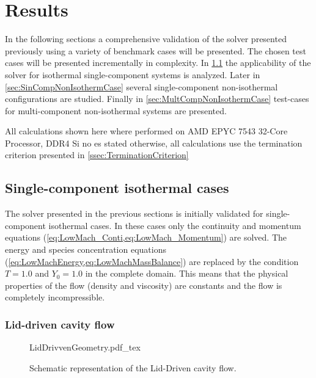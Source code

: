 \chapter{Results}	\label{ch:results}
\glsresetall
In the following sections a comprehensive validation of the solver presented previously using a variety of benchmark cases will be presented. The chosen test cases will be presented incrementally in complexity. In \cref{sec:SingleCompIsotCase} the applicability of the solver for isothermal single-component systems is analyzed. Later in \cref{sec:SinCompNonIsothermCase} several single-component non-isothermal configurations are studied. Finally in \cref{sec:MultCompNonIsothermCase} test-cases for multi-component non-isothermal systems are presented. 



All calculations shown here where performed on AMD EPYC 7543 32-Core Processor, DDR4 %
Si no es stated otherwise, all calculations use the termination criterion presented in \cref{ssec:TerminationCriterion}



\section{Single-component isothermal cases}\label{sec:SingleCompIsotCase}
The solver presented in the previous sections is initially validated for single-component isothermal cases. In these cases only the continuity and momentum equations (\cref{eq:LowMach_Conti,eq:LowMach_Momentum}) are solved. The energy and species concentration equations (\cref{eq:LowMachEnergy,eq:LowMachMassBalance}) are replaced by the condition $T = 1.0$ and $Y_0 = 1.0$ in the complete domain. This means that the physical properties of the flow (density and viscosity) are constants and the flow is completely incompressible.

\subsection{Lid-driven cavity flow}
\begin{figure}[b]
	\begin{center}
		\def\svgwidth{0.3\textwidth}
		{LidDrivvenGeometry.pdf_tex}		
		\caption{Schematic representation of the Lid-Driven cavity flow.}
		\label{fig:LidDrivenCavity}
	\end{center}	
\end{figure} 

